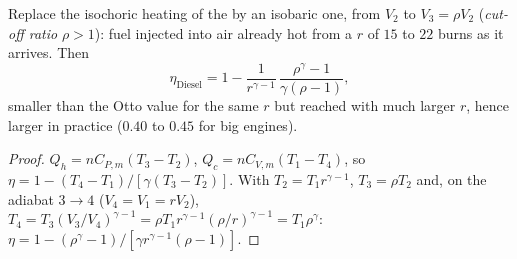 \begin{proposition}\label{prop:b1:heat-engines:diesel}
Replace the isochoric heating of the  by an isobaric one, from
$V_2$ to $V_3 = \rho V_2$ (\emph{cut-off ratio} $\rho > 1$): fuel injected
into air already hot from a  $r$ of $15$ to $22$ burns
as it arrives. Then
\[
\eta_{\text{Diesel}} = 1 - \frac{1}{r^{\gamma-1}}\,\frac{\rho^{\gamma} - 1}{\gamma(\rho - 1)} ,
\]
smaller than the Otto value for the same $r$ but reached with much
larger $r$, hence larger in practice ($0.40$ to $0.45$ for big engines).
\end{proposition}

\begin{proof}
$Q_h = nC_{P,m}(T_3 - T_2)$, $Q_c = nC_{V,m}(T_1 - T_4)$, so $\eta = 1 -
(T_4 - T_1)/[\gamma(T_3 - T_2)]$. With $T_2 = T_1r^{\gamma-1}$, $T_3 =
\rho T_2$ and, on the adiabat $3 \to 4$ ($V_4 = V_1 = rV_2$), $T_4 =
T_3(V_3/V_4)^{\gamma-1} = \rho T_1 r^{\gamma-1}(\rho/r)^{\gamma-1} = T_1\rho^{\gamma}$:
$\eta = 1 - (\rho^\gamma - 1)/[\gamma r^{\gamma-1}(\rho - 1)]$.
\end{proof}


